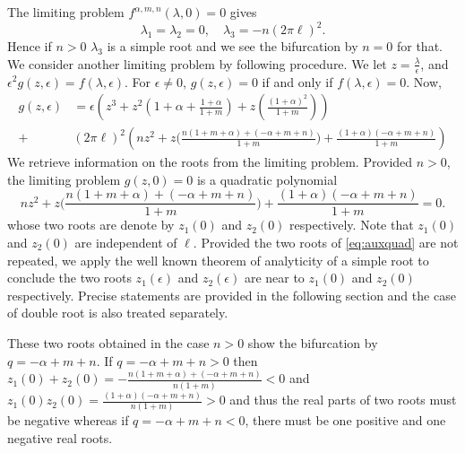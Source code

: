 \documentclass[a4paper,11pt]{article}
\def\l{(2\pi \ell)}
\theoremstyle{remark}
\begin{document}
The limiting problem $f^{\alpha,m,n}(\lambda,0)=0$ gives
$$ \lambda_1=\lambda_2=0, \quad \lambda_3 = -n\l^2.$$
Hence if $n>0$ $\lambda_3$ is a simple root and we see the bifurcation by $n=0$ for that. We consider another limiting problem by following procedure. 
We let $z = \frac{\lambda}{\epsilon}$, and $\epsilon^2 g(z,\epsilon) =  f(\lambda, \epsilon)$. For $\epsilon\ne0$, $g(z,\epsilon)=0$ if and only if $f(\lambda,\epsilon)=0$. Now,
\begin{align} 
 g(z,\epsilon) &= \epsilon\left( z^3 + z^2\left(1+\alpha + \frac{1+\alpha}{1+m}\right) + z\left(\frac{(1+\alpha)^2}{1+m}\right)\right) \nonumber\\
 +& \l^2\left(nz^2 + z\Big( \frac{n(1+m+\alpha) + (-\alpha+m+n)}{1+m}\Big) + \frac{(1+\alpha)(-\alpha+m+n)}{1+m}  \right) \label{eq:reduced_poly}
\end{align}
We retrieve information on the roots from the limiting problem. Provided $n>0$, the limiting problem $g(z,0)=0$ is a quadratic polynomial
\begin{equation} 
nz^2 + z\Big( \frac{n(1+m+\alpha) + (-\alpha+m+n)}{1+m}\Big) + \frac{(1+\alpha)(-\alpha+m+n)}{1+m} =0. \label{eq:auxquad}
\end{equation}
whose two roots are  denote by $z_1(0)$ and $z_2(0)$ respectively.
Note that $z_1(0)$ and $z_2(0)$ are independent of $\ell$. Provided the two roots of \eqref{eq:auxquad} are not repeated, we apply the well known theorem of analyticity of a simple root to conclude the two roots $z_1(\epsilon)$ and $z_2(\epsilon)$ are near to $z_1(0)$ and $z_2(0)$ respectively. Precise statements are provided in the following section and the case of double root is also treated separately.

These two roots obtained in the case $n>0$ show the bifurcation by $q=-\alpha+m+n$. If $q=-\alpha+m+n>0$ then $z_1(0)+z_2(0) = -\frac{n(1+m+\alpha) + (-\alpha+m+n)}{n(1+m)} < 0$ and $z_1(0)z_2(0)=\frac{(1+\alpha)(-\alpha+m+n)}{n(1+m)}>0$ and thus the real parts of two roots must be negative whereas if $q=-\alpha+m+n<0$, there must be one positive and one negative real roots.
\end{document}
